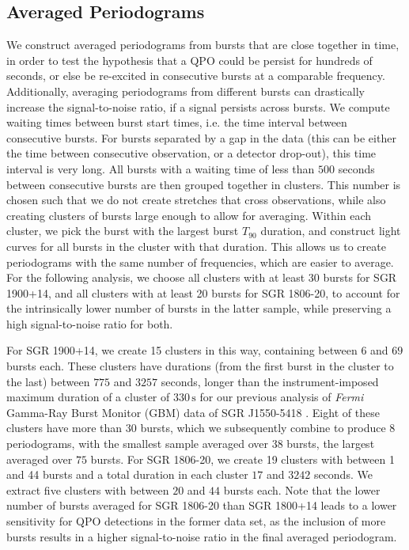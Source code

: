 \documentclass[numberedappendix]{emulateapj}
\begin{document}
\subsection{Averaged Periodograms}
\label{sec:psd_average}
We construct averaged periodograms from bursts that are close together in time, in order to test the hypothesis that a QPO could be persist for hundreds of seconds, or else be re-excited in consecutive bursts at a comparable frequency. Additionally, averaging periodograms from different bursts can drastically increase the signal-to-noise ratio, if a signal persists across bursts. We compute waiting times between burst start times, i.e. the time interval between consecutive bursts. For bursts separated by a gap in the data (this can be either the time between consecutive observation, or a detector drop-out), this time interval is very long. All bursts with a waiting time of less than $500$ seconds between consecutive bursts are then grouped together in clusters. This number is chosen such that we do not create stretches that cross observations, while also creating clusters of bursts large enough to allow for averaging. Within each cluster, we pick the burst with the largest burst $T_{90}$ duration, and construct light curves for all bursts in the cluster with that duration. This allows us to create periodograms with the same number of frequencies, which are easier to average. For the following analysis, we choose all clusters with at least 30 bursts for SGR 1900+14, and all clusters with at least 20 bursts for SGR 1806-20, to account for the intrinsically lower number of bursts in the latter sample, while preserving a high signal-to-noise ratio for both.

For SGR 1900+14, we create 15 clusters in this way, containing between $6$ and $69$ bursts each. These clusters have durations (from the first burst in the cluster to the last) between $775$ and $3257$ seconds, longer than the instrument-imposed maximum duration of a cluster of $330 \, \mathrm{s}$ for our previous analysis of {\it Fermi} Gamma-Ray Burst Monitor (GBM) data of SGR J1550-5418 \citep{huppenkothen2014}. Eight of these clusters have more than $30$ bursts, which we subsequently combine to produce 8 periodograms, with the smallest sample averaged over $38$ bursts, the largest averaged over $75$ bursts.
For SGR 1806-20, we create 19 clusters with between 1 and 44 bursts and a total duration in each cluster $17$ and $3242$ seconds. We extract five clusters with between $20$ and $44$ bursts each. Note that the lower number of bursts averaged for SGR 1806-20 than SGR 1800+14 leads to a lower sensitivity for QPO detections in the former data set, as the inclusion of more bursts results in a higher signal-to-noise ratio in the final averaged periodogram.
\end{document}
